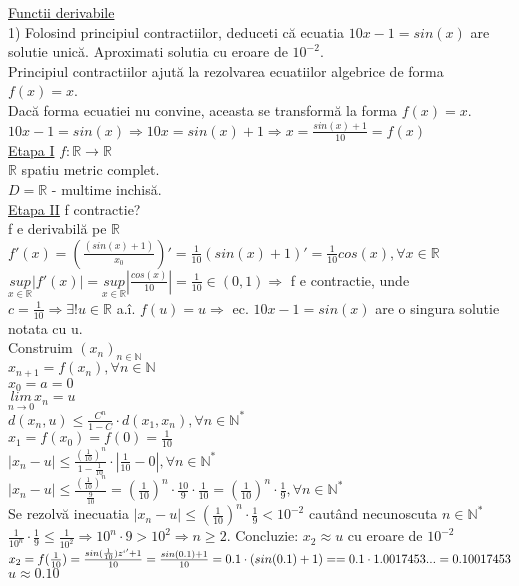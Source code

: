 \documentclass[12pt]{extarticle}
\begin{document}
	\huge \underline{Functii derivabile} \\
	{\large
		1) Folosind principiul contractiilor, deduceti că ecuatia $10x - 1 = sin(x)$ are solutie unică. Aproximati solutia cu eroare de $10^{-2}$. \\
		Principiul contractiilor ajută la rezolvarea ecuatiilor algebrice de forma $f(x) = x$. \\
		Dacă forma ecuatiei nu convine, aceasta se transformă la forma $f(x) = x$. \\
		$10x - 1 = sin(x) \Rightarrow 10x = sin(x) + 1 \Rightarrow x = \frac{sin(x) + 1}{10} = f(x)$ \\
		\underline{Etapa I} $f : \mathbb{R} \to \mathbb{R}$ \\
		$\mathbb{R}$ spatiu metric complet. \\
		$D = \mathbb{R}$ - multime inchisă. \\
		\underline{Etapa II} f contractie? \\
		f e derivabilă pe $\mathbb{R}$ \\
		$f'(x) = (\frac{(sin(x) + 1)}{x_{0}})' = \frac{1}{10}(sin(x) + 1)' = \frac{1}{10}cos(x), \forall x \in \mathbb{R}$ \\
		$\underset{x \in \mathbb{R}}{sup}|f'(x)| = \underset{x \in \mathbb{R}}{sup}|\frac{cos(x)}{10}| = \frac{1}{10} \in (0, 1) \Rightarrow$ f e contractie, unde $c = \frac{1}{10} \Rightarrow \exists ! u \in \mathbb{R}$ a.î. $f(u) = u \Rightarrow$ ec. $10x - 1 = sin(x)$ are o singura solutie notata cu u. \\
		Construim $(x_{n})_{n \in \mathbb{N}}$ \\
		$x_{n + 1} = f(x_{n}), \forall n \in \mathbb{N}$ \\
		$x_{0} = a = 0$ \\
		$\underset{n \to 0}{lim}x_{n} = u$ \\
		$d(x_{n}, u) \leq \frac{C^{n}}{1 - C} \cdot d(x_{1}, x_{n}), \forall n \in \mathbb{N}^{*}$ \\
		$x_{1} = f(x_{0}) = f(0) = \frac{1}{10}$ \\
		$|x_{n} - u| \leq \frac{(\frac{1}{10})^{n}}{1 - \frac{1}{10}} \cdot |\frac{1}{10} - 0|, \forall n \in \mathbb{N}^{*}$ \\
		$|x_{n} - u| \leq \frac{(\frac{1}{10})^{n}}{\frac{9}{10}} = (\frac{1}{10})^{n} \cdot \frac{10}{9} \cdot \frac{1}{10} = (\frac{1}{10})^{n} \cdot \frac{1}{9}, \forall n \in \mathbb{N}^{*}$ \\
		Se rezolvă inecuatia $|x_{n} - u| \leq (\frac{1}{10})^{n} \cdot \frac{1}{9} < 10^{-2}$ cautând necunoscuta $n \in \mathbb{N}^{*}$ \\
		$\frac{1}{10^{n}} \cdot \frac{1}{9} \leq \frac{1}{10^{2}} \Rightarrow 10^{n} \cdot 9 > 10^{2} \Rightarrow n \geq 2$. Concluzie: $x_{2} \approx u$ cu eroare de $10^{-2}$ \\
		$x_{2} = f(\frac{1}{10}) = \frac{sin(\frac{1}{10})z`' + 1}{10} = \frac{sin(0.1) + 1}{10} = 0.1 \cdot (sin(0.1) + 1) = = 0.1 \cdot 1.0017453... = 0.10017453$ \\
		$u \approx 0.10$ \\
		
}
\end{document}
